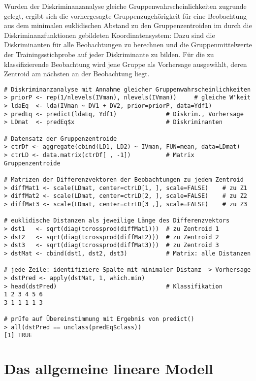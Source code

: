 Wurden der Diskriminanzanalyse gleiche Gruppenwahrscheinlichkeiten zugrunde gelegt, ergibt sich die vorhergesagte Gruppenzugehörigkeit für eine Beobachtung aus dem minimalen euklidischen Abstand zu den Gruppenzentroiden im durch die Diskriminanzfunktionen gebildeten Koordinatensystem: Dazu sind die Diskriminanten für alle Beobachtungen zu berechnen und die Gruppenmittelwerte der Trainingsstichprobe auf jeder Diskriminante zu bilden. Für die zu klassifizierende Beobachtung wird jene Gruppe als Vorhersage ausgewählt, deren Zentroid am nächsten an der Beobachtung liegt.
\begin{lstlisting}
# Diskriminanzanalyse mit Annahme gleicher Gruppenwahrscheinlichkeiten
> priorP <- rep(1/nlevels(IVman), nlevels(IVman))     # gleiche W'keit
> ldaEq  <- lda(IVman ~ DV1 + DV2, prior=priorP, data=Ydf1)
> predEq <- predict(ldaEq, Ydf1)              # Diskrim., Vorhersage
> LDmat  <- predEq$x                          # Diskriminanten

# Datensatz der Gruppenzentroide
> ctrDf <- aggregate(cbind(LD1, LD2) ~ IVman, FUN=mean, data=LDmat)
> ctrLD <- data.matrix(ctrDf[ , -1])          # Matrix Gruppenzentroide

# Matrizen der Differenzvektoren der Beobachtungen zu jedem Zentroid
> diffMat1 <- scale(LDmat, center=ctrLD[1, ], scale=FALSE)    # zu Z1
> diffMat2 <- scale(LDmat, center=ctrLD[2, ], scale=FALSE)    # zu Z2
> diffMat3 <- scale(LDmat, center=ctrLD[3 ,], scale=FALSE)    # zu Z3

# euklidische Distanzen als jeweilige Länge des Differenzvektors
> dst1   <- sqrt(diag(tcrossprod(diffMat1)))  # zu Zentroid 1
> dst2   <- sqrt(diag(tcrossprod(diffMat2)))  # zu Zentroid 2
> dst3   <- sqrt(diag(tcrossprod(diffMat3)))  # zu Zentroid 3
> dstMat <- cbind(dst1, dst2, dst3)           # Matrix: alle Distanzen

# jede Zeile: identifiziere Spalte mit minimaler Distanz -> Vorhersage
> dstPred <- apply(dstMat, 1, which.min)
> head(dstPred)                               # Klassifikation
1 2 3 4 5 6
3 1 1 1 1 3

# prüfe auf Übereinstimmung mit Ergebnis von predict()
> all(dstPred == unclass(predEq$class))
[1] TRUE
\end{lstlisting}

\section{Das allgemeine lineare Modell}
\label{sec:multALM}

